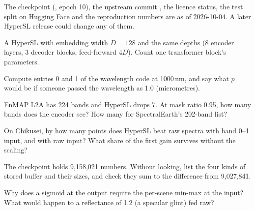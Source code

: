 \begin{drift}
The checkpoint (, epoch 10), the upstream commit , the licence status, the test split
on Hugging Face and the reproduction numbers are as of 2026-10-04. A later HyperSL release could change any of them.
\end{drift}

\begin{confusions}
\end{confusions}

\begin{checkyourself}
\item\label{ex:hslwhat:1} A HyperSL with embedding width $D=128$ and the same depths (8 encoder layers, 3 decoder blocks, feed-forward
  $4D$). Count one transformer block's parameters.
\item\label{ex:hslwhat:2} Compute entries 0 and 1 of the wavelength code at 1000\,nm, and say what $p$ would be if someone passed the
  wavelength as 1.0 (micrometres).
\item\label{ex:hslwhat:3} EnMAP L2A has 224 bands and HyperSL drops 7. At mask ratio 0.95, how many bands does the encoder see? How many
  for SpectralEarth's 202-band list?
\item\label{ex:hslwhat:4} On Chikusei, by how many points does HyperSL beat raw spectra with band 0--1 input, and with raw input? What
  share of the first gain survives without the scaling?
\item\label{ex:hslwhat:5} The checkpoint holds 9,158,021 numbers. Without looking, list the four kinds of stored buffer and their sizes,
  and check they sum to the difference from 9,027,841.
\item\label{ex:hslwhat:6} Why does a sigmoid at the output require the per-scene min-max at the input? What would happen to a reflectance
  of 1.2 (a specular glint) fed raw?
\end{checkyourself}

